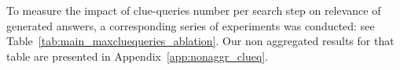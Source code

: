 To measure the impact of clue-queries number per search step on relevance of generated answers, a corresponding series of experiments was conducted: see Table~\ref{tab:main_maxcluequeries_ablation}. Our non aggregated results for that table are presented in Appendix~\ref{app:nonaggr_clueq}.



